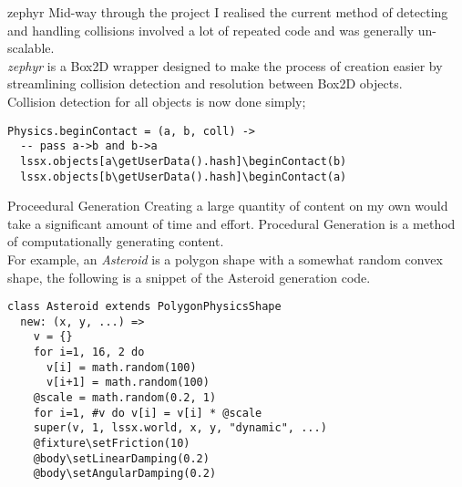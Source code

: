 \documentclass{beamer}
\begin{document}

\begin{frame}[fragile=singleslide]{zephyr}
  Mid-way through the project I realised the current method of detecting and handling collisions involved a lot of repeated code and was generally un-scalable. \\
  
  \textit{zephyr} is a Box2D wrapper designed to make the process of creation easier by streamlining collision detection and resolution between Box2D objects.\\

  Collision detection for all objects is now done simply;\\
\begin{verbatim}
Physics.beginContact = (a, b, coll) ->
  -- pass a->b and b->a
  lssx.objects[a\getUserData().hash]\beginContact(b)
  lssx.objects[b\getUserData().hash]\beginContact(a)
\end{verbatim}
\end{frame}


\begin{frame}[fragile=singleslide]{Proceedural Generation}
Creating a large quantity of content on my own would take a significant amount of time and effort. Procedural Generation is a method of computationally generating content. \\

For example, an \textit{Asteroid} is a polygon shape with a somewhat random convex shape, the following is a snippet of the Asteroid generation code.

\begin{verbatim}
class Asteroid extends PolygonPhysicsShape
  new: (x, y, ...) =>
    v = {}
    for i=1, 16, 2 do
      v[i] = math.random(100)
      v[i+1] = math.random(100)
    @scale = math.random(0.2, 1)
    for i=1, #v do v[i] = v[i] * @scale
    super(v, 1, lssx.world, x, y, "dynamic", ...)
    @fixture\setFriction(10)
    @body\setLinearDamping(0.2)
    @body\setAngularDamping(0.2)
\end{verbatim}

\end{frame}

\end{document}
